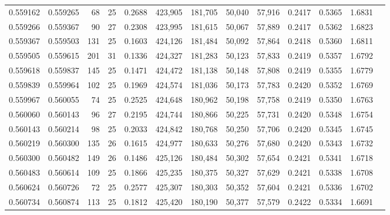 \begin{tabular}{rrrrrrrrrrrrr}
0.559162 & 0.559265 &    68 &  25 &                                     0.2688 & 423,905 & 181,705 &  50,040 &  57,916 & 0.2417 & 0.5365 & 1.6831 \\
0.559266 & 0.559367 &    90 &  27 &                                     0.2308 & 423,995 & 181,615 &  50,067 &  57,889 & 0.2417 & 0.5362 & 1.6823 \\
0.559367 & 0.559503 &   131 &  25 &                                     0.1603 & 424,126 & 181,484 &  50,092 &  57,864 & 0.2418 & 0.5360 & 1.6811 \\
0.559505 & 0.559615 &   201 &  31 &                                     0.1336 & 424,327 & 181,283 &  50,123 &  57,833 & 0.2419 & 0.5357 & 1.6792 \\
0.559618 & 0.559837 &   145 &  25 &                                     0.1471 & 424,472 & 181,138 &  50,148 &  57,808 & 0.2419 & 0.5355 & 1.6779 \\
0.559839 & 0.559964 &   102 &  25 &                                     0.1969 & 424,574 & 181,036 &  50,173 &  57,783 & 0.2420 & 0.5352 & 1.6769 \\
0.559967 & 0.560055 &    74 &  25 &                                     0.2525 & 424,648 & 180,962 &  50,198 &  57,758 & 0.2419 & 0.5350 & 1.6763 \\
0.560060 & 0.560143 &    96 &  27 &                                     0.2195 & 424,744 & 180,866 &  50,225 &  57,731 & 0.2420 & 0.5348 & 1.6754 \\
0.560143 & 0.560214 &    98 &  25 &                                     0.2033 & 424,842 & 180,768 &  50,250 &  57,706 & 0.2420 & 0.5345 & 1.6745 \\
0.560219 & 0.560300 &   135 &  26 &                                     0.1615 & 424,977 & 180,633 &  50,276 &  57,680 & 0.2420 & 0.5343 & 1.6732 \\
0.560300 & 0.560482 &   149 &  26 &                                     0.1486 & 425,126 & 180,484 &  50,302 &  57,654 & 0.2421 & 0.5341 & 1.6718 \\
0.560483 & 0.560614 &   109 &  25 &                                     0.1866 & 425,235 & 180,375 &  50,327 &  57,629 & 0.2421 & 0.5338 & 1.6708 \\
0.560624 & 0.560726 &    72 &  25 &                                     0.2577 & 425,307 & 180,303 &  50,352 &  57,604 & 0.2421 & 0.5336 & 1.6702 \\
0.560734 & 0.560874 &   113 &  25 &                                     0.1812 & 425,420 & 180,190 &  50,377 &  57,579 & 0.2422 & 0.5334 & 1.6691 \\

\end{tabular}
